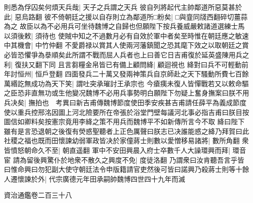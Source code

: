 則悉為俘囚矣何煩天兵哉|{
	天子之兵謂之天兵}
彼自列將起代主帥鄰道所惡莫甚於此|{
	惡烏路翻}
彼不倚朝廷之援以自存則立為鄰道所□粉矣|{
	□與韲同牋西翻碎切薑蒜為之}
故臣以為不必用兵可坐待魏博之自歸也但願陛下按兵養威嚴敕諸道選練士馬以須後敕|{
	須待也}
使賊中知之不過數月必有自效於軍中者矣至時惟在朝廷應之敏速中其機會|{
	中竹仲翻}
不愛爵禄以賞其人使兩河藩鎮聞之恐其麾下效之以取朝廷之賞必皆恐懼爭為㳟順矣此所謂不戰而屈人兵者也上曰善它日吉甫復於延英盛陳用兵之利|{
	復扶又翻下同}
且言芻糧金帛皆已有備上顧問絳|{
	顧迴視也}
絳對曰兵不可輕動前年討恒州|{
	恒戶登翻}
四面發兵二十萬又發兩神策兵自京師赴之天下騷動所費七百餘萬緡訖無成功為天下笑|{
	謂吐突承璀討王承宗也}
今瘡痍未復人皆憚戰若又以敕命驅之臣恐非直無功或生他變况魏博不必用兵事勢明白願陛下勿疑上奮身撫案曰朕不用兵决矣|{
	撫拍也　考異曰新吉甫傳魏博節度使田季安疾甚吉甫請任薛平為義成節度使以重兵控邢洺因圖上河北險要所在帝張於浴堂門壁每議河北事必指吉甫曰朕目按圖信如卿料矣按憲宗竟用李絳之策不用兵而魏博平不如新傳所言今不取}
絳曰陛下雖有是言恐退朝之後復有熒惑聖聽者上正色厲聲曰朕志已决誰能惑之絳乃拜賀曰此社稷之福也既而田懷諫幼弱軍政皆决於家僮蔣士則數以愛憎移易諸將|{
	數所角翻}
衆皆憤怒朝命久不至|{
	朝直遥翻}
軍中不安田興晨入府士卒數千人大譟環興而拜|{
	環音宦}
請為留後興驚仆於地衆不散久之興度不免|{
	度徒洛翻}
乃謂衆曰汝肯聽吾言乎皆曰惟命興曰勿犯副大使守朝廷法令申版籍請官吏然後可皆曰諾興乃殺蔣士則等十餘人遷懷諫於外|{
	代宗廣德元年田承嗣帥魏博四世四十九年而滅}


資治通鑑卷二百三十八
